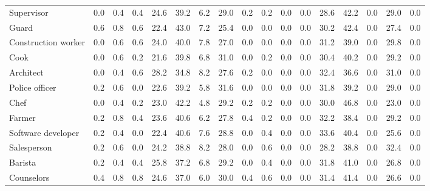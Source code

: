 \begin{table*}[p]
{\begin{tabular}{l|cccccccc|cccccccc}
Supervisor
& 0.0 & 0.4 & 0.4 & 24.6 & 39.2 & 6.2 & 29.0 & 0.2 & 0.2 & 0.0 & 0.0 & 28.6 & 42.2 & 0.0 & 29.0 & 0.0 \\
Guard
& 0.6 & 0.8 & 0.6 & 22.4 & 43.0 & 7.2 & 25.4 & 0.0 & 0.0 & 0.0 & 0.0 & 30.2 & 42.4 & 0.0 & 27.4 & 0.0 \\
Construction worker
& 0.0 & 0.6 & 0.6 & 24.0 & 40.0 & 7.8 & 27.0 & 0.0 & 0.0 & 0.0 & 0.0 & 31.2 & 39.0 & 0.0 & 29.8 & 0.0 \\
Cook
& 0.0 & 0.6 & 0.2 & 21.6 & 39.8 & 6.8 & 31.0 & 0.0 & 0.2 & 0.0 & 0.0 & 30.4 & 40.2 & 0.0 & 29.2 & 0.0 \\
Architect
& 0.0 & 0.4 & 0.6 & 28.2 & 34.8 & 8.2 & 27.6 & 0.2 & 0.0 & 0.0 & 0.0 & 32.4 & 36.6 & 0.0 & 31.0 & 0.0 \\
Police officer
& 0.2 & 0.6 & 0.0 & 22.6 & 39.2 & 5.8 & 31.6 & 0.0 & 0.0 & 0.0 & 0.0 & 31.8 & 39.2 & 0.0 & 29.0 & 0.0 \\
Chef
& 0.0 & 0.4 & 0.2 & 23.0 & 42.2 & 4.8 & 29.2 & 0.2 & 0.2 & 0.0 & 0.0 & 30.0 & 46.8 & 0.0 & 23.0 & 0.0 \\
Farmer
& 0.2 & 0.8 & 0.4 & 23.6 & 40.6 & 6.2 & 27.8 & 0.4 & 0.2 & 0.0 & 0.0 & 32.2 & 38.4 & 0.0 & 29.2 & 0.0 \\
Software developer
& 0.2 & 0.4 & 0.0 & 22.4 & 40.6 & 7.6 & 28.8 & 0.0 & 0.4 & 0.0 & 0.0 & 33.6 & 40.4 & 0.0 & 25.6 & 0.0 \\
Salesperson
& 0.2 & 0.6 & 0.0 & 24.2 & 38.8 & 8.2 & 28.0 & 0.0 & 0.6 & 0.0 & 0.0 & 28.2 & 38.8 & 0.0 & 32.4 & 0.0 \\
Barista
& 0.2 & 0.4 & 0.4 & 25.8 & 37.2 & 6.8 & 29.2 & 0.0 & 0.4 & 0.0 & 0.0 & 31.8 & 41.0 & 0.0 & 26.8 & 0.0 \\
Counselors
& 0.4 & 0.8 & 0.8 & 24.6 & 37.0 & 6.0 & 30.0 & 0.4 & 0.6 & 0.0 & 0.0 & 31.4 & 41.4 & 0.0 & 26.6 & 0.0 \\

\bottomrule
\end{tabular}
}
\label{appendix:results-emotion-ratio-part1-2}
\end{table*}